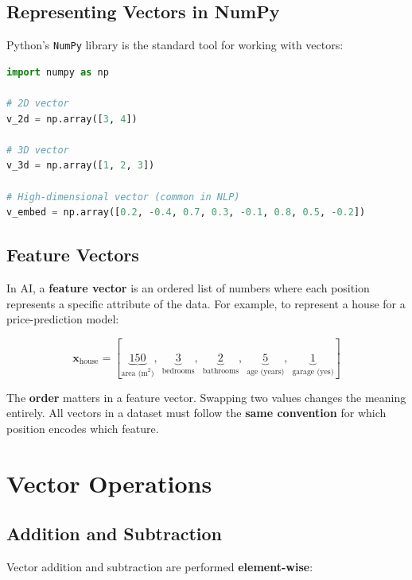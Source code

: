 \documentclass[11pt,a4paper]{article}
\begin{document}
\subsection{Representing Vectors in NumPy}

Python's \texttt{NumPy} library is the standard tool for working with vectors:

\begin{lstlisting}[language=Python]
import numpy as np

# 2D vector
v_2d = np.array([3, 4])

# 3D vector
v_3d = np.array([1, 2, 3])

# High-dimensional vector (common in NLP)
v_embed = np.array([0.2, -0.4, 0.7, 0.3, -0.1, 0.8, 0.5, -0.2])
\end{lstlisting}

\subsection{Feature Vectors}

In AI, a \textbf{feature vector} is an ordered list of numbers where each position represents a specific attribute of the data. For example, to represent a house for a price-prediction model:

\[
\mathbf{x}_{\text{house}} = [\underbrace{150}_{\text{area (m}^2\text{)}},\; \underbrace{3}_{\text{bedrooms}},\; \underbrace{2}_{\text{bathrooms}},\; \underbrace{5}_{\text{age (years)}},\; \underbrace{1}_{\text{garage (yes)}}]
\]

\begin{tcolorbox}[warnbox={Important}]
The \textbf{order} matters in a feature vector. Swapping two values changes the meaning entirely. All vectors in a dataset must follow the \textbf{same convention} for which position encodes which feature.
\end{tcolorbox}

\section{Vector Operations}

\subsection{Addition and Subtraction}

Vector addition and subtraction are performed \textbf{element-wise}:
\end{document}
